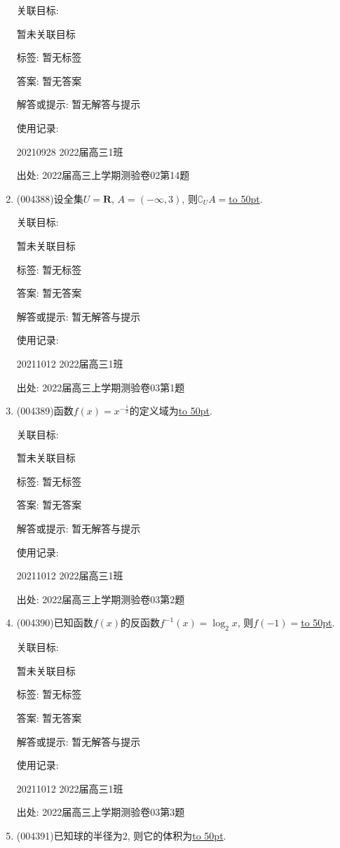 \documentclass[10pt,a4paper]{article}
\newcommand{\blank}[1]{\underline{\hbox to #1pt{}}}
\begin{document}
\begin{enumerate}[1.]
关联目标:

暂未关联目标



标签: 暂无标签

答案: 暂无答案

解答或提示: 暂无解答与提示

使用记录:

20210928	2022届高三1班		


出处: 2022届高三上学期测验卷02第14题
\item { (004388)}设全集$U=\mathbf{R}$, $A=(-\infty ,3)$, 则$\complement_UA=$\blank{50}.


关联目标:

暂未关联目标



标签: 暂无标签

答案: 暂无答案

解答或提示: 暂无解答与提示

使用记录:

20211012	2022届高三1班	


出处: 2022届高三上学期测验卷03第1题
\item { (004389)}函数$f(x)=x^{- \frac 12}$的定义域为\blank{50}.


关联目标:

暂未关联目标



标签: 暂无标签

答案: 暂无答案

解答或提示: 暂无解答与提示

使用记录:

20211012	2022届高三1班	


出处: 2022届高三上学期测验卷03第2题
\item { (004390)}已知函数$f(x)$的反函数$f^{-1}(x)=\log_2x$, 则$f(-1)=$\blank{50}.


关联目标:

暂未关联目标



标签: 暂无标签

答案: 暂无答案

解答或提示: 暂无解答与提示

使用记录:

20211012	2022届高三1班	


出处: 2022届高三上学期测验卷03第3题
\item { (004391)}已知球的半径为$2$, 则它的体积为\blank{50}.



\end{enumerate}
\end{document}

